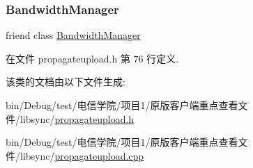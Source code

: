 \subsubsection{\texorpdfstring{Bandwidth\+Manager}{BandwidthManager}}
{\footnotesize\ttfamily friend class \hyperlink{class_o_c_c_1_1_bandwidth_manager}{Bandwidth\+Manager}\hspace{0.3cm}{\ttfamily [friend]}}



在文件 propagateupload.\+h 第 76 行定义.



该类的文档由以下文件生成\+:\begin{DoxyCompactItemize}
\item 
bin/\+Debug/test/电信学院/项目1/原版客户端重点查看文件/libsync/\hyperlink{propagateupload_8h}{propagateupload.\+h}\item 
bin/\+Debug/test/电信学院/项目1/原版客户端重点查看文件/libsync/\hyperlink{propagateupload_8cpp}{propagateupload.\+cpp}\end{DoxyCompactItemize}
